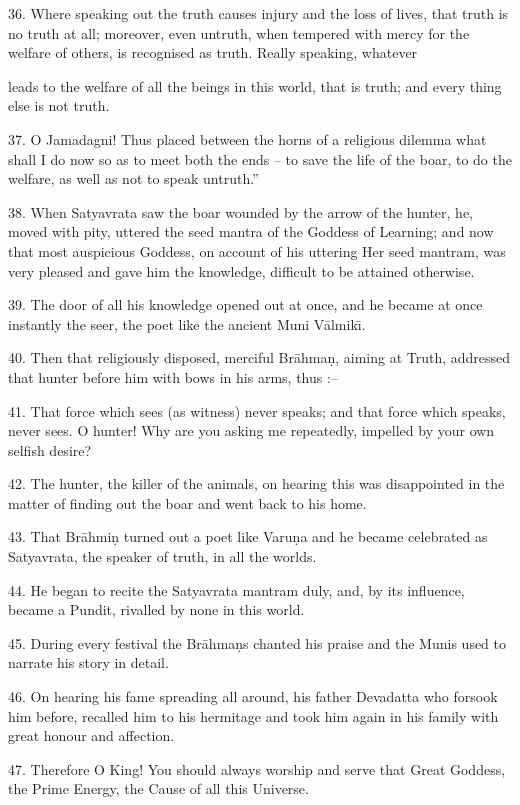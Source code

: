 36. Where speaking out the truth causes injury and the loss of lives, that truth is no truth at all; moreover, even untruth, when tempered with mercy for the welfare of others, is recognised as truth. Really speaking, whatever

leads to the welfare of all the beings in this world, that is truth; and every thing else is not truth.

37. O Jamadagni! Thus placed between the horns of a religious dilemma what shall I do now so as to meet both the ends -- to save the life of the boar, to do the welfare, as well as not to speak untruth.''

38. When Satyavrata saw the boar wounded by the arrow of the hunter, he, moved with pity, uttered the seed mantra of the Goddess of Learning; and now that most auspicious Goddess, on account of his uttering Her seed mantram, was very pleased and gave him the knowledge, difficult to be attained otherwise.

39. The door of all his knowledge opened out at once, and he became at once instantly the seer, the poet like the ancient Muni V\=almik\={\i}.

40. Then that religiously disposed, merciful Br\=ahma\d{n}, aiming at Truth, addressed that hunter before him with bows in his arms, thus :--

41. That force which sees (as witness) never speaks; and that force which speaks, never sees. O hunter! Why are you asking me repeatedly, impelled by your own selfish desire?

42. The hunter, the killer of the animals, on hearing this was disappointed in the matter of finding out the boar and went back to his home.

43. That Br\=ahmi\d{n} turned out a poet like Varu\d{n}a and he became celebrated as Satyavrata, the speaker of truth, in all the worlds.

44. He began to recite the Satyavrata mantram duly, and, by its influence, became a Pundit, rivalled by none in this world.

45. During every festival the Br\=ahma\d{n}s chanted his praise and the Munis used to narrate his story in detail.

46. On hearing his fame spreading all around, his father Devadatta who forsook him before, recalled him to his hermitage and took him again in his family with great honour and affection.

47. Therefore O King! You should always worship and serve that Great Goddess, the Prime Energy, the Cause of all this Universe.

